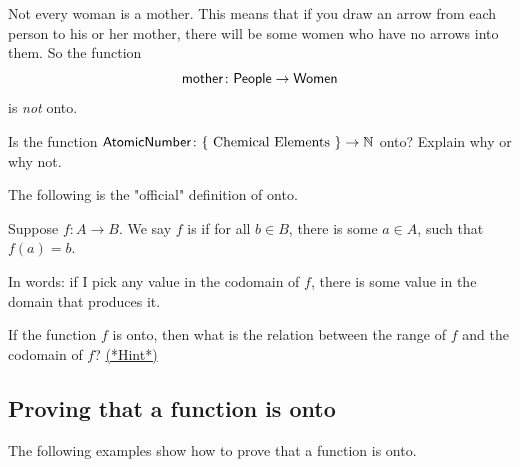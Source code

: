 \begin{example}{}
 Not every woman is a mother. 
This means that if you draw an arrow from each person to his or her mother, there will be some women who have no arrows into them. So the function 
\[ \sf{mother} \colon \sf{People} \to \sf{Women} \]
 is \emph{not} onto.
\end{example}

\begin{exercise}{}
Is the function $\sf{Atomic Number} \colon \{ \mbox{ Chemical Elements } \} \to \mathbb{N}$ onto?  Explain why or why not.
\end{exercise}

The following is the "official" definition  of onto.

\begin{defn}
Suppose $f \colon A \to B$. We say $f$ is  if for all $b \in B$, 
there is some $a \in A$, such that $f(a) = b$. 
\end{defn}

In words: if I pick any value in the codomain of $f$, there is some value in the domain that produces it.

\begin{exercise}{45}
If the function $f$ is onto, then what is the relation between the range of $f$ and the codomain of $f$?
\hyperref[sec:functions:hints]{(*Hint*)}
\end{exercise}


\subsection{Proving that a function is onto}

The following examples show how to prove that a function is onto.

